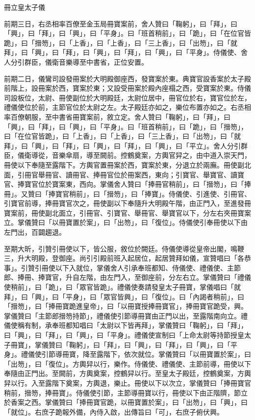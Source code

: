 \begin{pinyinscope}
 冊立皇太子儀



 前期三日，右丞相率百僚至金玉局冊寶案前，舍人贊曰「鞠躬」，曰「拜」，曰「興」，曰「拜」，曰「興」，曰「平身」。曰「班首稍前」，曰「跪」，曰「在位官皆跪」，曰「搢笏」，曰「上香」，曰「上香」，曰「三上香」，曰「出笏」，曰「就拜」，曰「興」，曰「拜」，曰「興」，曰「拜」，曰「興」，曰「平身」。侍儀使、舍人分引群臣，儀衛音樂導至中書省，正位安置。



 前期二日，儀鸞司設發冊案於大明殿御座西，發寶案於東。典寶官設香案於太子殿前階上，設冊案於西，寶案於東；又設受冊案於殿內座榻之西，受寶案於東。侍儀司設板位，太尉、冊使副位於大明殿廷，太尉位居中，冊官位於右，寶官位於左，禮儀使位於前，主節官位於太尉之左。太子殿廷亦如之，樂位布置亦如之。右丞相率百僚朝服，至中書省冊寶案前，敘立定。舍人贊曰「鞠躬」，曰「拜」，曰「興」，曰「拜」，曰「興」，曰「平身」。曰「班首稍前」，曰「跪」，曰「搢笏」，曰「在位官皆跪」，曰「上香」，曰「上香」，曰「三上香」，曰「出笏」，曰「就拜」，曰「興」，曰「拜」，曰「興」，曰「拜」，曰「興」，曰「平立」。舍人分引群臣，儀衛導從，音樂傘扇，導至闕前。控鶴奠案，方輿官舁之，由中道入崇天門，冊使以下奉隨至露階下。方輿官置冊案於西，寶案於東，分退立於兩廡。冊使副北面，引冊官舉冊官、讀冊官、捧冊官位於冊案西，東向；引寶官、舉寶官、讀寶官、捧寶官位於寶案東，西向。掌儀舍人贊曰「捧冊官稍前」，曰「搢笏」，曰「捧冊」。又贊曰「捧寶官稍前」，曰「搢笏」，曰「捧寶」。侍儀使、引進使、引冊官、引寶官前導，捧冊寶官次之，冊使副以下奉隨升大明殿午階，由正門入，至進發冊寶案前，冊使副北面立，引冊官、引寶官、舉冊官、舉寶官以下，分左右夾冊寶案立。掌儀贊曰「以冊寶置於案」，曰「出笏」，曰「復位」。侍儀使引奉冊使以下由左門出，百闢趨退。



 至期大昕，引贊引冊使以下，皆公服，敘位於闕廷。侍儀使導從皇帝出閣，鳴鞭三，升大明殿，登御座。尚引引殿前班入起居位，起居贊拜如儀，宣贊唱曰「各恭事」。引贊引冊使以下入就位，掌儀舍人引承奉班都知、侍儀使、禮儀使、主節郎、捧冊、捧寶官，升自左階，由左門入，至御座前，分左右立。掌儀贊曰「禮儀使稍前」，曰「跪」，曰「眾官皆跪」。禮儀使奏請發皇太子冊寶，掌儀唱曰「就拜」，曰「興」，曰「平身」，曰「眾官皆興」，曰「復位」。曰「內謁者稍前」，曰「搢笏」，曰「捧冊寶跪進皇帝」，曰「以冊寶授捧冊寶官」，捧冊寶官跪受，興。掌儀贊曰「主節郎搢笏持節」，禮儀使引節導冊寶由正門以出，至露階南向立。禮儀使稱有制，承奉班都知唱曰「太尉以下皆再拜」，掌儀贊曰「鞠躬」，曰「拜」，曰「興」，曰「拜」，曰「興」，曰「平身」。禮儀使宣制曰「上命太尉等持節授皇太子冊寶」，掌儀贊曰「鞠躬」，曰「拜」，曰「興」，曰「拜」，曰「興」，曰「平身」。禮儀使引節導冊寶，降至露階下，依次就位。掌儀贊曰「以冊寶置於案」，曰「出笏」，曰「復位」。方輿舁以行，樂作。侍儀使、禮儀使、主節前導，冊使以下奉隨由正門出。至闕前，方輿奠案，控鶴舁以行。至皇太子殿廷，控鶴奠案，方輿舁以行。入至露階下奠案，方輿退，樂止。冊使以下以次立，掌儀贊曰「捧冊寶官稍前，搢笏，捧冊寶」。侍儀使引節，主節導冊寶以行，冊使以下由正階隮，節立於香案之西。掌儀贊曰「捧冊寶官跪，以冊寶置於案」，曰「出笏」，曰「興」，曰「就位」。右庶子跪報外備，內侍入啟，出傳旨曰「可」，右庶子俯伏興。




\end{pinyinscope}
